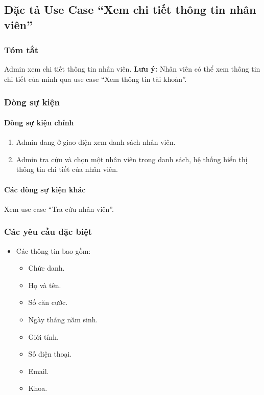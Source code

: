 \subsection{Đặc tả Use Case ``Xem chi tiết thông tin nhân viên''}

\subsubsection{Tóm tắt}
Admin xem chi tiết thông tin nhân viên.
\textbf{Lưu ý:} Nhân viên có thể xem thông tin chi tiết của mình qua use case ``Xem thông tin tài khoản''.

\subsubsection{Dòng sự kiện}
\paragraph{\textbf{Dòng sự kiện chính}}
\begin{enumerate}
  \item Admin đang ở giao diện xem danh sách nhân viên.
  \item Admin tra cứu và chọn một nhân viên trong danh sách, hệ thống hiển thị thông tin chi tiết của nhân viên.
\end{enumerate}

\paragraph{\textbf{Các dòng sự kiện khác}}
Xem use case ``Tra cứu nhân viên''.

\subsubsection{Các yêu cầu đặc biệt}
\begin{itemize}
  \item Các thông tin bao gồm:
    \begin{itemize}
      \item Chức danh.
      \item Họ và tên.
      \item Số căn cước.
      \item Ngày tháng năm sinh.
      \item Giới tính.
      \item Số điện thoại.
      \item Email.
      \item Khoa.
    \end{itemize}
\end{itemize}

